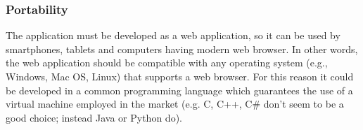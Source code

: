 \subsubsection{Portability}
The application must be developed as a web application, so it can be used by smartphones, tablets and computers having modern web browser. In other words, the web application should be compatible with any operating system (e.g., Windows, Mac OS, Linux) that supports a web browser. For this reason it could be developed in a common programming language which guarantees the use of a virtual machine employed in the market (e.g. C, C++, C\# don't seem to be a good choice; instead Java or Python do).

